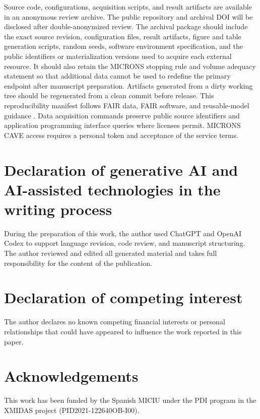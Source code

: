 \documentclass[a4paper,fleqn]{cas-sc}
\begin{document}
Source code, configurations, acquisition scripts, and result artifacts are
available in an anonymous review archive. The public repository and archival DOI
will be disclosed after double-anonymized review. The archival package should
include the exact source revision, configuration files, result artifacts, figure
and table generation scripts, random seeds, software environment specification,
and the public identifiers or materialization versions used to acquire each
external resource. It should also retain the MICRONS stopping rule and volume
adequacy statement so that additional data cannot be used to redefine the
primary endpoint after manuscript preparation. Artifacts generated from a dirty
working tree should be regenerated from a clean commit before release. This
reproducibility manifest follows FAIR data, FAIR
software, and reusable-model guidance \citep{wilkinson2016fair,barker2022fair4rs,patel2023fairbiors,sauro2026cure}.
Data acquisition commands preserve public source identifiers and application
programming interface queries where licenses permit. MICRONS CAVE access
requires a personal token and acceptance of the service terms.


\section{Declaration of generative AI and AI-assisted technologies in the writing process}
\label{sec:generative-ai-declaration}
During the preparation of this work, the author used ChatGPT and OpenAI Codex to support language revision, code review, and manuscript structuring. The author reviewed and edited all generated material and takes full responsibility for the content of the publication.

\section{Declaration of competing interest}
\label{sec:competing-interest}
The author declares no known competing financial interests or personal
relationships that could have appeared to influence the work reported in this
paper.

\section{Acknowledgements}
\label{sec:acknowledgements}
This work has been funded by the Spanish MICIU under the PDI program in the
XMIDAS project (PID2021-122640OB-I00).

\printcredits


\end{document}
